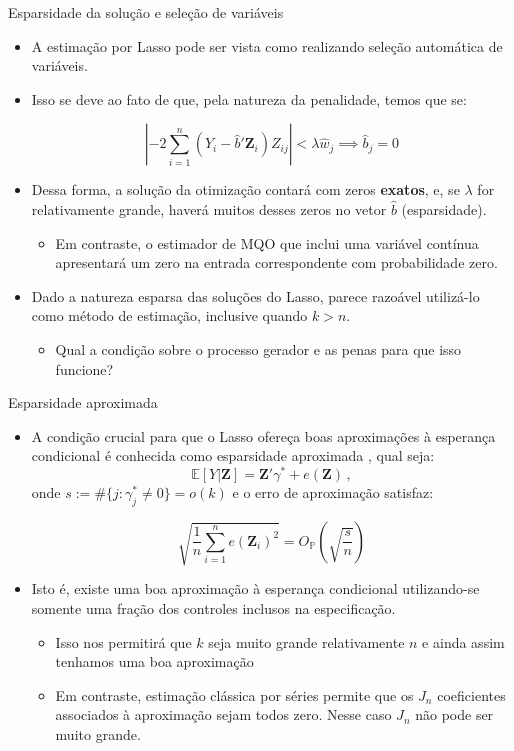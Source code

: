 \documentclass[11pt]{beamer}
\begin{document}
\begin{frame}{Esparsidade da solução e seleção de variáveis}
	\begin{itemize}
		\item A estimação por Lasso pode ser vista como realizando seleção automática de variáveis. 
		\item Isso se deve ao fato de que, pela natureza da penalidade, temos que se:
		
		$$\left|-2\sum_{i=1}^n(Y_i-\hat{b}'\boldsymbol{Z}_i)Z_{ij}\right| < \lambda \hat{w}_j \implies \hat{b}_j  = 0$$
		\item Dessa forma, a solução da otimização contará com {zeros} \textbf{exatos}, e, se $\lambda $ for relativamente grande, haverá muitos desses zeros no vetor  $\hat{b}$ (esparsidade).
		\begin{itemize}
			\item Em contraste, o estimador de MQO que inclui uma variável contínua apresentará um zero na entrada correspondente com probabilidade zero.
		\end{itemize}
		\item Dado a natureza esparsa das soluções do Lasso, parece razoável utilizá-lo como método de estimação, inclusive quando $k > n$.
		\begin{itemize}
			\item Qual a condição sobre o processo gerador e as penas para que isso funcione?
		\end{itemize}
	\end{itemize}
\end{frame}
\begin{frame}{Esparsidade aproximada}
\begin{itemize}
	\item A condição crucial para que o Lasso ofereça boas aproximações à esperança condicional é conhecida como {\color{blue}esparsidade aproximada} \citep{Bickel2009}, qual seja:
	$$\mathbb{E}[Y|\boldsymbol{Z}] = \boldsymbol{Z}'\gamma^*+ e(\boldsymbol{Z})\,,$$
	onde $ s:=\#\{j: \gamma^*_j \neq 0\} = o(k)$ e o erro de aproximação satisfaz:
	
	$$\sqrt{\frac{1}{n}\sum_{i=1}^n e(\boldsymbol{Z}_i)^2} = O_{\mathbb{P}}\left(\sqrt{\frac{s}{n}}\right)$$
	\item Isto é, existe uma boa aproximação à esperança condicional utilizando-se somente uma fração dos controles inclusos na especificação.
	\begin{itemize}
		\item Isso nos permitirá que $k$ seja muito grande relativamente $n$ e ainda assim tenhamos uma boa aproximação
		\item Em contraste, estimação clássica por séries permite que os $J_n$ coeficientes associados à aproximação sejam todos zero. Nesse caso $J_n$ não pode ser muito grande. 
	\end{itemize}
\end{itemize}
\end{frame}
\end{document}
